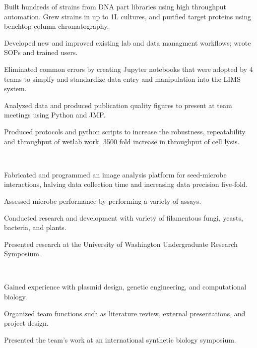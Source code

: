 \documentclass[]{forrest-resume-interfont}
\begin{document}
\begin{tightemize}
    \item Built hundreds of strains from DNA part libraries using high throughput automation. Grew strains in up to 1L cultures, and purified target proteins using benchtop column chromatography.
    \item Developed new and improved existing lab and data managment workflows; wrote SOPs and trained users. 
    \item Eliminated common errors by creating Jupyter notebooks that were adopted by 4 teams to simplfy and standardize data entry and manipulation into the LIMS system.
    \item Analyzed data and produced publication quality figures to present at team meetings using Python and JMP.
    \item Produced protocols and python scripts to increase the robustness, repeatability and throughput of wetlab work. 3500 fold increase in throughput of cell lysis.
\end{tightemize}

\spacesep

\\

\begin{tightemize}
    \item Fabricated and programmed an image analysis platform for seed-microbe interactions, halving data collection time and increasing data precision five-fold.
    \item Assessed microbe performance by performing a variety of assays.
    \item Conducted research and development with variety of filamentous fungi, yeasts, bacteria, and plants.
    \item Presented research at the University of Washington Undergraduate Research Symposium.
\end{tightemize}

\spacesep

\\

\begin{tightemize}
    \item Gained experience with plasmid design, genetic engineering, and computational biology.
    \item Organized team functions such as literature review, external presentations, and project design.
    \item Presented the team's work at an international synthetic biology symposium.
\end{tightemize}
\end{document}
